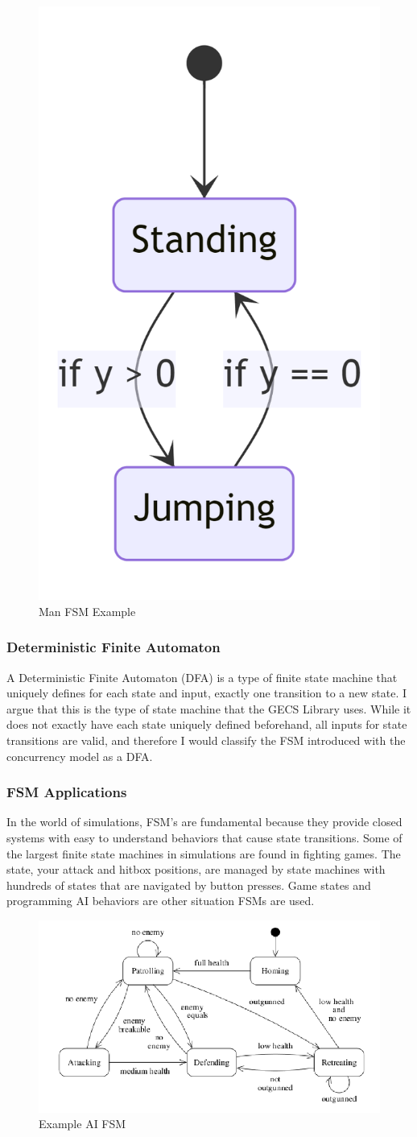 \begin{figure}[H]
    \centering
    \includegraphics[width=0.25\linewidth]{resources/man_fsm_example.png}
    \caption{Man FSM Example}
    \label{fig:graph2}
\end{figure}

\subsubsection{Deterministic Finite Automaton}
A Deterministic Finite Automaton (DFA) is a type of finite state machine that uniquely defines for each state and input, exactly one transition to a new state. I argue that this is the type of state machine that the GECS Library uses. While it does not exactly have each state uniquely defined beforehand, all inputs for state transitions are valid, and therefore I would classify the FSM introduced with the concurrency model as a DFA.

\subsubsection{FSM Applications}
In the world of simulations, FSM's are fundamental because they provide closed systems with easy to understand behaviors that cause state transitions. Some of the largest finite state machines in simulations are found in fighting games. The state, your attack and hitbox positions, are managed by state machines with hundreds of states that are navigated by button presses. Game states and programming AI behaviors are other situation FSMs are used. 

\begin{figure}[H]
    \centering
    \includegraphics[width=0.8\linewidth]{resources/soldier_fsm.png}
    \caption{Example AI FSM \cite{FSM}}
    \label{fig:graph2}
\end{figure}